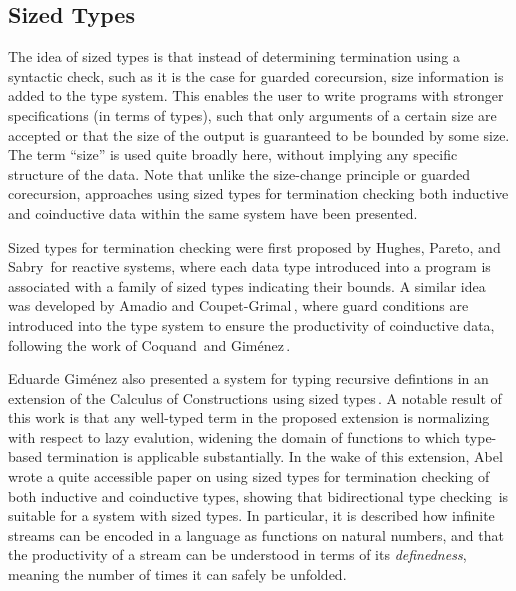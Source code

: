 \subsection{Sized Types}
\label{sec:sized_types}
The idea of sized types is that instead of determining termination using a syntactic check, such as it is the case for guarded corecursion, size information is added to the type system. This enables the user to write programs with stronger specifications (in terms of types), such that only  arguments of a certain size are accepted or that the size of the output is guaranteed to be bounded by some size. The term ``size'' is used quite broadly here, without implying any specific structure of the data. Note that unlike the size-change principle or guarded corecursion, approaches using sized types for termination checking both inductive and coinductive data within the same system have been presented.

Sized types for termination checking were first proposed by Hughes, Pareto, and Sabry\,\citep{Hughes96} for reactive systems, where each data type introduced into a program is associated with a family of sized types indicating their bounds. A similar idea was developed by Amadio and Coupet-Grimal\,\citep{Amadio98}, where guard conditions are introduced into the type system to ensure the productivity of coinductive data, following the work of Coquand\,\citep{Coquand94} and Gim\'{e}nez\,\citep{Gimenez95}.

Eduarde Gim\'{e}nez also presented a system for typing recursive defintions in an extension of the Calculus of Constructions using sized types\,\citep{Gimenez98structuralrecursive}. A notable result of this work is that any well-typed term in the proposed extension is normalizing with respect to lazy evalution, widening the domain of functions to which type-based termination is applicable substantially. In the wake of this extension, Abel\,\citep{Abel99terminationchecking} wrote a quite accessible paper on using sized types for termination checking of both inductive and coinductive types, showing that bidirectional type checking\,\citep{Pierce00} is suitable for a system with sized types. In particular, it is described how infinite streams can be encoded in a language as functions on natural numbers, and that the productivity of a stream can be understood in terms of its \emph{definedness}, meaning the number of times it can safely be unfolded.

